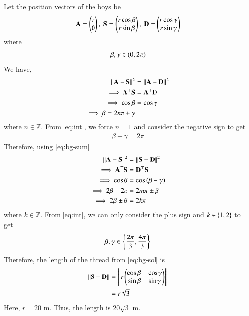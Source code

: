 \documentclass[journal,12pt,twocolumn]{IEEEtran}
\renewcommand{\vec}[1]{\boldsymbol{\mathbf{#1}}}
\begin{document}
\begin{enumerate}
    \solution Let the position vectors of the boys be
    \begin{align}
        \vec{A} = \myvec{r\\0},\ \vec{S} = \myvec{r\cos\beta\\r\sin\beta},\ \vec{D} = \myvec{r\cos\gamma\\r\sin\gamma}
        \label{eq:pos-vec-def}
    \end{align}
    where
    \begin{align}
        \beta, \gamma \in \left(0,2\pi\right)
        \label{eq:int}
    \end{align}
    We have,
    \begin{align}
        \norm{\vec{A}-\vec{S}}^2 &= \norm{\vec{A}-\vec{D}}^2 \\
        \implies \vec{A}^\top\vec{S} &= \vec{A}^\top\vec{D} \\
        \implies \cos\beta &= \cos\gamma \\
        \implies \beta = 2n\pi \pm \gamma
        \label{eq:bg-gen}
    \end{align}
    where $n \in \mathbb{Z}$. From \eqref{eq:int}, we force $n = 1$
    and consider the negative sign to get
    \begin{align}
        \beta+\gamma = 2\pi
        \label{eq:bg-sum}
    \end{align}
    Therefore, using \eqref{eq:bg-sum}
    \begin{align}
        \norm{\vec{A}-\vec{S}}^2 &= \norm{\vec{S}-\vec{D}}^2 \\
        \implies \vec{A}^\top\vec{S} &= \vec{D}^\top\vec{S} \\
        \implies \cos\beta &= \cos\brak{\beta-\gamma} \\
        \implies 2\beta-2\pi &= 2m\pi\pm\beta \\
        \implies 2\beta\pm\beta &= 2k\pi
        \label{eq:beta-eqn}
    \end{align}
    where $k \in \mathbb{Z}$. From \eqref{eq:int}, we can only consider
    the plus sign and $k \in \left\{1,2\right\}$ to get
    \begin{align}
        \beta,\gamma \in \left\{\frac{2\pi}{3},\frac{4\pi}{3}\right\}
        \label{eq:bg-sol}
    \end{align}
    Therefore, the length of the thread from \eqref{eq:bg-sol} is
    \begin{align}
        \norm{\vec{S}-\vec{D}} &= \norm{r\myvec{\cos\beta-\cos\gamma\\\sin\beta-\sin\gamma}} \\
                               &= r\sqrt{3}
    \end{align}
    Here, $r = 20$ m. Thus, the length is $20\sqrt{3}$ m.


\end{enumerate}
\end{document}
